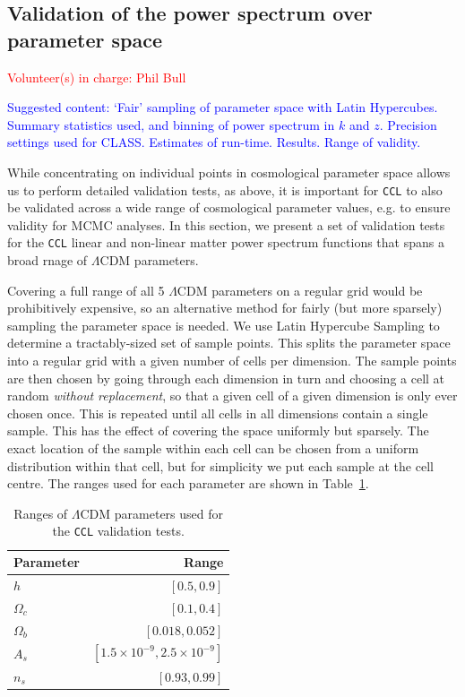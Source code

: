 \documentclass[\docopts]{\docclass}
\newcommand{\vol}[1]{\textcolor{red}{Volunteer(s) in charge: #1}}
\newcommand{\cont}[1]{\textcolor{blue}{Suggested content: #1}}
\newcommand{\ccl}{{\tt CCL}\xspace}
\begin{document}
\subsection{Validation of the power spectrum over parameter space}
\vol{Phil Bull}

\cont{ `Fair' sampling of parameter space with Latin Hypercubes. Summary statistics used, and binning of power spectrum in $k$ and $z$. Precision settings used for CLASS. Estimates of run-time. Results. Range of validity.}

While concentrating on individual points in cosmological parameter space allows us to perform detailed validation tests, as above, it is important for \ccl to also be validated across a wide range of cosmological parameter values, e.g. to ensure validity for MCMC analyses. In this section, we present a set of validation tests for the \ccl linear and non-linear matter power spectrum functions that spans a broad rnage of $\Lambda$CDM parameters.

Covering a full range of all 5 $\Lambda$CDM parameters on a regular grid would be prohibitively expensive, so an alternative method for fairly (but more sparsely) sampling the parameter space is needed. We use Latin Hypercube Sampling to determine a tractably-sized set of sample points. This splits the parameter space into a regular grid with a given number of cells per dimension. The sample points are then chosen by going through each dimension in turn and choosing a cell at random {\it without replacement}, so that a given cell of a given dimension is only ever chosen once. This is repeated until all cells in all dimensions contain a single sample. This has the effect of covering the space uniformly but sparsely. The exact location of the sample within each cell can be chosen from a uniform distribution within that cell, but for simplicity we put each sample at the cell centre. The ranges used for each parameter are shown in Table~\ref{tab:paramranges}.
%
\begin{table}[ht]
  \centering
  \begin{tabular}{l | r}
    \hline
    Parameter & Range \\
    \hline
    $h$ & $[0.5, 0.9]$ \\
    $\Omega_c$ & $[0.1, 0.4]$ \\
    $\Omega_b$ & $[0.018, 0.052]$ \\
    $A_s$ & $[1.5 \times 10^{-9}, 2.5 \times 10^{-9}]$ \\
    $n_s$ & $[0.93, 0.99]$ \\
    \hline
  \end{tabular}
  \caption{Ranges of $\Lambda$CDM parameters used for the \ccl validation tests.}
  \label{tab:paramranges}
\end{table}
\end{document}

